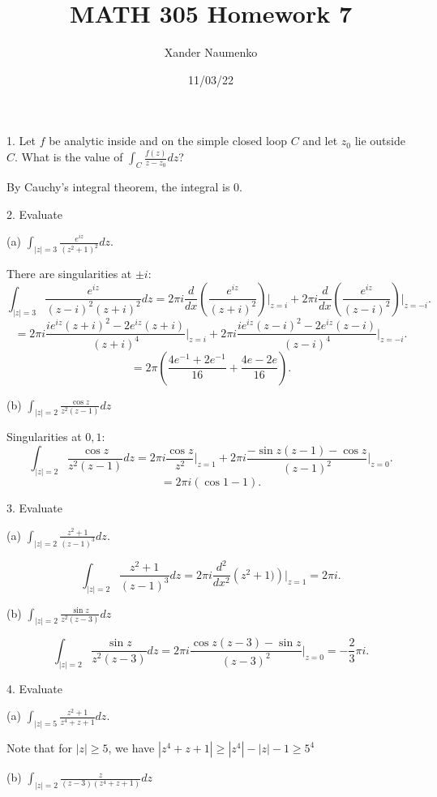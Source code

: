 \documentclass[letterpaper, reqno,11pt]{article}
\begin{document}
\title{MATH 305 Homework 7}
\date{11/03/22}
\author{Xander Naumenko}
\maketitle

1. Let $ f$ be analytic inside and on the simple closed loop $C$ and let $z_0$ lie outside $C$. What is the value of $ \int_{C} \frac{f(z)}{ z-z_0 } dz $?

By Cauchy's integral theorem, the integral is $0$. 

\medskip


2. Evaluate

(a) $\int_{|z|=3} \frac{e^{iz}}{ (z^2+1)^2} dz$.   

There are singularities at $\pm i$: 
\[
\int_{|z|=3}\frac{e^{iz}}{(z-i)^2(z+i)^2}dz=2\pi i \frac{d}{dx}\left(\frac{e^{iz}}{(z+i)^2}\right)\bigg|_{z=i}+2\pi i \frac{d}{dx}\left(\frac{e^{iz}}{(z-i)^2}\right)\bigg|_{z=-i}
.\]
\[
=2\pi i \frac{ie^{iz}(z+i)^2-2e^{iz}(z+i)}{(z+i)^{4}}\bigg|_{z=i}+2\pi i  \frac{ie^{iz}(z-i)^2-2e^{iz}(z-i)}{(z-i)^{4}}\bigg|_{z=-i}
.\]
\[
=2\pi \left( \frac{4e^{-1}+2e^{-1}}{16}+\frac{4e-2e}{16} \right) 
.\]

(b) $ \int_{|z|=2} \frac{ \cos z}{ z^2 (z-1)} dz$

Singularities at $0, 1$: 
 \[
\int_{|z|=2} \frac{\cos z}{z^2(z-1)}dz=2\pi i\frac{\cos z}{z^2}\bigg|_{z=1}+2\pi i \frac{-\sin z (z-1)-\cos z}{(z-1)^2}\bigg|_{z=0}
.\]
\[
=2\pi i\left( \cos 1-1 \right) 
.\]

\medskip


3. Evaluate

(a) $\int_{|z|=2} \frac{z^2+1}{ (z-1)^3} dz$. 

\[
\int_{|z|=2} \frac{z^2+1}{ (z-1)^3} dz=2\pi i\frac{d^2}{dx^2}\left( z^2+1) \right) \bigg|_{z=1}=2\pi i
.\]

(b) $ \int_{|z|=2} \frac{\sin z}{z^2 (z-3)} dz $

\[
\int_{|z|=2} \frac{\sin z}{z^2 (z-3)} dz =2 \pi i\frac{\cos z(z-3)-\sin z}{(z-3)^2}\bigg|_{z=0}=-\frac{2}{3}\pi i
.\]

\medskip

4. Evaluate

(a) $\int_{|z|=5} \frac{ z^2+1}{ z^4+ z+1} dz$. 

Note that for $|z|\geq 5$, we have $\left|z^{4}+z+1\right|\geq|z^{4}|-|z|-1  \geq 5^{4}$

(b) $ \int_{|z|=2} \frac{z}{ (z-3) (z^4+z+1)} dz $
\end{document}
